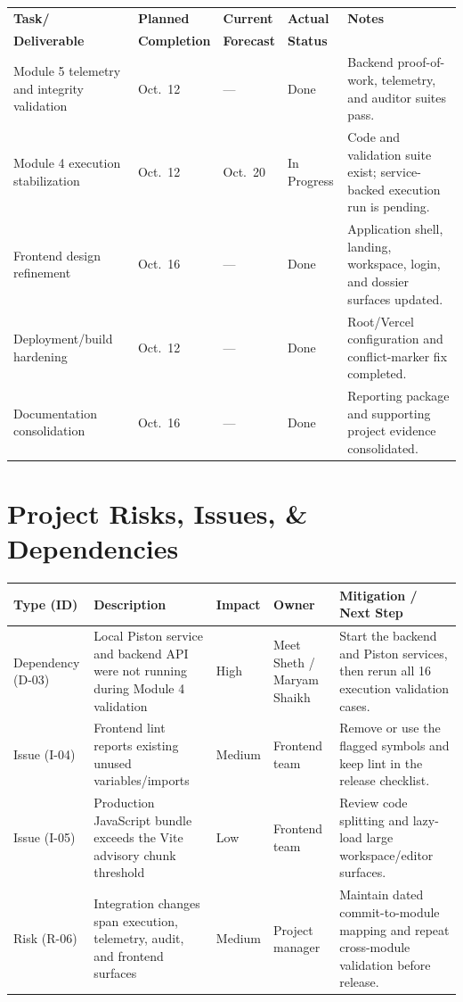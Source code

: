 \documentclass[11pt,a4paper]{article}
\begin{document}
\small
\begin{tabular}{p{} p{} p{} p{} p{}}
\toprule
\textbf{Task/} & \textbf{Planned} & \textbf{Current} & \textbf{Actual} & \textbf{Notes} \\
\textbf{Deliverable} & \textbf{Completion} & \textbf{Forecast} & \textbf{Status} & \\
\midrule
Module 5 telemetry and integrity validation & Oct.\ 12 & --- & Done & Backend proof-of-work, telemetry, and auditor suites pass. \\
Module 4 execution stabilization & Oct.\ 12 & Oct.\ 20 & In Progress & Code and validation suite exist; service-backed execution run is pending. \\
Frontend design refinement & Oct.\ 16 & --- & Done & Application shell, landing, workspace, login, and dossier surfaces updated. \\
Deployment/build hardening & Oct.\ 12 & --- & Done & Root/Vercel configuration and conflict-marker fix completed. \\
Documentation consolidation & Oct.\ 16 & --- & Done & Reporting package and supporting project evidence consolidated. \\
\bottomrule
\end{tabular}
\normalsize

\section{Project Risks, Issues, \& Dependencies}

\small
\begin{tabular}{p{} p{} p{} p{} p{}}
\toprule
\textbf{Type (ID)} & \textbf{Description} & \textbf{Impact} & \textbf{Owner} & \textbf{Mitigation / Next Step} \\
\midrule
Dependency (D-03) & Local Piston service and backend API were not running during Module 4 validation & High & Meet Sheth / Maryam Shaikh & Start the backend and Piston services, then rerun all 16 execution validation cases. \\
Issue (I-04) & Frontend lint reports existing unused variables/imports & Medium & Frontend team & Remove or use the flagged symbols and keep lint in the release checklist. \\
Issue (I-05) & Production JavaScript bundle exceeds the Vite advisory chunk threshold & Low & Frontend team & Review code splitting and lazy-load large workspace/editor surfaces. \\
Risk (R-06) & Integration changes span execution, telemetry, audit, and frontend surfaces & Medium & Project manager & Maintain dated commit-to-module mapping and repeat cross-module validation before release. \\
\bottomrule
\end{tabular}
\normalsize
\end{document}
